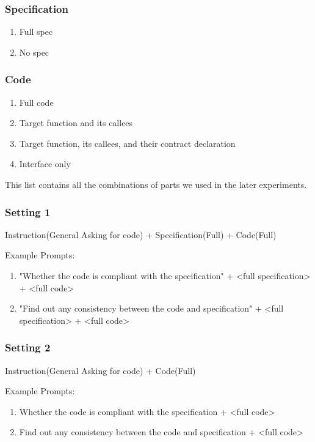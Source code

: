 \subsubsection{Specification}
\begin{enumerate}
    \item Full spec
    \item No spec
\end{enumerate}
\subsubsection{Code}
\begin{enumerate}
    \item Full code
    \item Target function and its callees
    \item Target function, its callees, and their contract declaration
    \item Interface only
\end{enumerate}


This list contains all the combinations of parts we used in the later experiments.


\subsubsection{ Setting 1 }
Instruction(General Asking for code) + Specification(Full) + Code(Full)

Example Prompts: 
\begin{enumerate}
\item "Whether the code is compliant with the specification" + <full specification> + <full code>
\item "Find out any consistency between the code and specification" + <full specification> + <full code>
\end{enumerate}

\subsubsection{ Setting 2 }
Instruction(General Asking for code) + Code(Full)

Example Prompts: 
\begin{enumerate}
\item Whether the code is compliant with the specification + <full code>
\item Find out any consistency between the code and specification  + <full code>
\end{enumerate}

